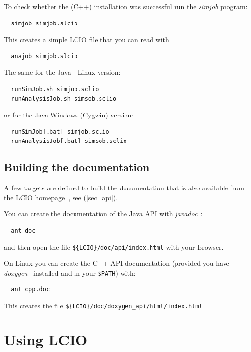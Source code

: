 \documentclass[twoside]{article}
\begin{document}
To check whether the (C++) installation was successful run the {\it simjob} program:
\begin{verbatim}
  simjob simjob.slcio
\end{verbatim}
This creates a simple LCIO file that you can read with 
\begin{verbatim}
  anajob simjob.slcio
\end{verbatim}
The same for the Java - Linux version:
\begin{verbatim}
  runSimJob.sh simjob.sclio
  runAnalysisJob.sh simsob.sclio
\end{verbatim}
or for the Java Windows (Cygwin) version:
\begin{verbatim}
  runSimJob[.bat] simjob.sclio
  runAnalysisJob[.bat] simsob.sclio
\end{verbatim}

\subsection {Building the documentation} \label{build_doc}

A few targets are defined to build the documentation that is also available from the 
LCIO homepage~\cite{lcio_home}, see (\ref{sec_api}).

You can create the documentation of the Java API with {\em javadoc}~\cite{ref_javadoc}:
\begin{verbatim}
  ant doc 
\end{verbatim}
and then open the file \verb|${LCIO}/doc/api/index.html| with your Browser. %

\vspace{\baselineskip}
On Linux you can create the C++ API documentation (provided you have {\em doxygen}~\cite{ref_doxygen} 
installed and in your \verb|$PATH|) %
with:
\begin{verbatim}
  ant cpp.doc      
\end{verbatim}
This creates the file \verb|${LCIO}/doc/doxygen_api/html/index.html|   %

\newpage
\section{Using LCIO}
\end{document}
